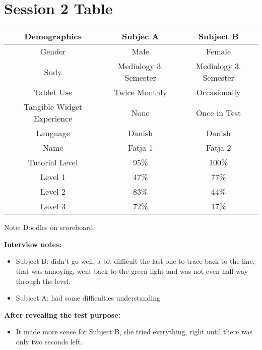 \section*{Session 2 Table}
\begin{tabular}{|c|c|c|}
\hline 
\textbf{Demographics} & Subjec A & Subject B \\ 
\hline 
Gender & Male  & Female \\ 
\hline 
Sudy & Medialogy 3. Semester & Medialogy 3. Semester \\ 
\hline 
Tablet Use & Twice Monthly & Occasionally\\ 
\hline 
Tangible Widget Experience & None & Once in Test \\ 
\hline 
Language & Danish & Danish\\ 
\hline 
Name & Fatja 1 & Fatja 2\\ 
\hline \hline
Tutorial Level & 95\% & 100\% \\ 
\hline 
Level 1 & 47\% & 77\% \\ 
\hline 
Level 2 & 83\% & 44\% \\ 
\hline 
Level 3 & 72\% & 17\% \\ 
\hline 
\end{tabular} 

Note: Doodles on scoreboard.

\textbf{Interview notes:}
\begin{itemize}
\item Subject B: didn’t go well, a bit difficult the last one to trace back to the line, that was annoying, went back to the green light and was not even half way through the level.
\item Subject A: had some difficulties understanding 
\end{itemize}

\textbf{After revealing the test purpose:}
\begin{itemize}
\item It made more sense for Subject B, she tried everything, right until there was only two seconds left.
\end{itemize}

